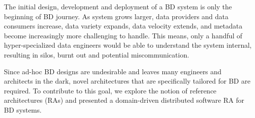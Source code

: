 \documentclass[runningheads]{llncs}
\begin{document}
The initial design, development and deployment of a BD system is only the beginning of BD journey. As system grows larger, data providers and data consumers increase, data variety expands, data velocity extends, and metadata become increasingly more challenging to handle. This means, only a handful of hyper-specialized data engineers would be able to understand the system internal, resulting in silos, burnt out and potential miscommunication. 

Since ad-hoc BD designs are undesirable and leaves many engineers and architects in the dark, novel architectures that are specifically tailored for BD are required. To contribute to this goal, we explore the notion of reference architectures (RAs) and presented a domain-driven distributed software RA for BD systems.

%
%



\end{document}
